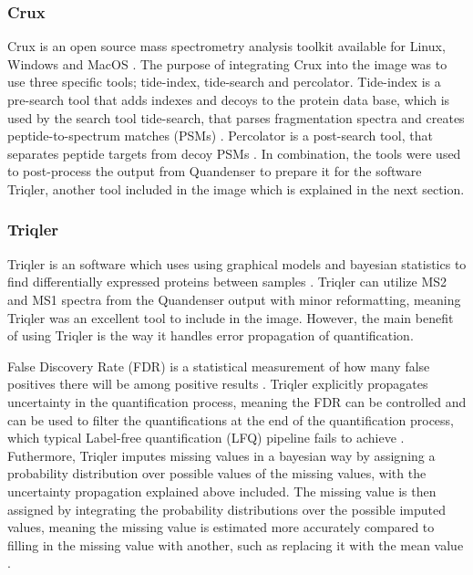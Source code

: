 \subsubsection{Crux}
Crux is an open source mass spectrometry analysis toolkit available for Linux, Windows and MacOS \cite{crux}. The purpose of integrating Crux into the image was to use three specific tools; tide-index, tide-search and percolator. Tide-index is a pre-search tool that adds indexes and decoys to the protein data base, which is used by the search tool tide-search, that parses fragmentation spectra and creates peptide-to-spectrum matches (PSMs) \cite{tide-search}. Percolator is a post-search tool, that separates peptide targets from decoy PSMs \cite{percolator}. In combination, the tools were used to post-process the output from Quandenser to prepare it for the software Triqler, another tool included in the image which is explained in the next section.

\subsubsection{Triqler}
Triqler is an software which uses using graphical models and bayesian statistics to find differentially expressed proteins between samples \cite{triqler}. Triqler can utilize MS2 and MS1 spectra from the Quandenser output with minor reformatting, meaning Triqler was an excellent tool to include in the image. However, the main benefit of using Triqler is the way it handles error propagation of quantification.

False Discovery Rate (FDR) is a statistical measurement of how many false positives there will be among positive results \cite{fdr}.  Triqler explicitly propagates uncertainty in the quantification process, meaning the FDR can be controlled and can be used to filter the quantifications at the end of the quantification process, which typical Label-free quantification (LFQ) pipeline fails to achieve \cite{triqler}. Futhermore, Triqler imputes missing values in a bayesian way by assigning a probability distribution over possible values of the missing values, with the uncertainty propagation explained above included. The missing value is then assigned by integrating the probability distributions over the possible imputed values, meaning the missing value is estimated more accurately compared to filling in the missing value with another, such as replacing it with the mean value \cite{triqler}.

